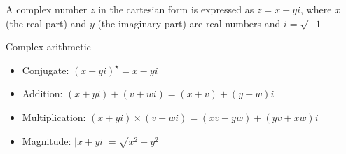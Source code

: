 \documentclass[8pt,a4paper,compress]{beamer}
\begin{document}
\begin{frame}[fragile]
\pause

\begin{minipage}{200pt}
A complex number $z$ in the cartesian form is expressed as $z = x+yi$, where $x$ (the real part) and $y$ (the imaginary part) are real numbers and $i=\sqrt{-1}$
\end{minipage}%
\hfill
\begin{minipage}{100pt}
\begin{center}
\end{center}
\end{minipage}%

\pause
\bigskip

Complex arithmetic
\begin{itemize}
\pause
\item Conjugate: $(x+yi)^\star=x-yi$

\pause
\item Addition: $(x+yi)+(v+wi) = (x+v) + (y+w)i$

\pause
\item Multiplication: $(x+yi)\times(v+wi) = (xv-yw) + (yv+xw)i$

\pause
\item Magnitude: $|x+yi|=\sqrt{x^2+y^2}$
\end{itemize}

\pause
\bigskip


\end{frame}
\end{document}
